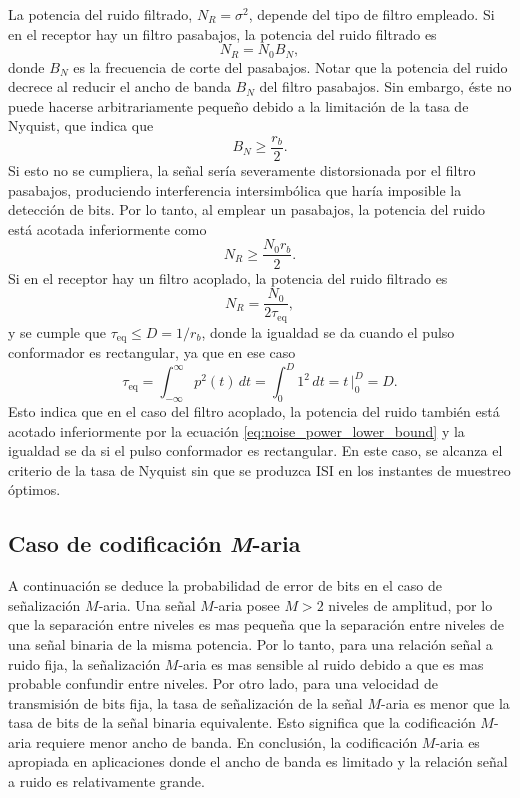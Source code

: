\documentclass[a4paper]{article}
\begin{document}
La potencia del ruido filtrado, \(N_R=\sigma^2\), depende del tipo de filtro empleado. Si en el receptor hay un filtro pasabajos, la potencia del ruido filtrado es
\[
 N_R=N_0B_N,
\]
donde \(B_N\) es la frecuencia de corte del pasabajos. Notar que la potencia del ruido decrece al reducir el ancho de banda \(B_N\) del filtro pasabajos. Sin embargo, éste no puede hacerse arbitrariamente pequeño debido a la limitación de la tasa de Nyquist, que indica que
\[
 B_N\geq\frac{r_b}{2}.
\]
Si esto no se cumpliera, la señal sería severamente distorsionada por el filtro pasabajos, produciendo interferencia intersimbólica que haría imposible la detección de bits. Por lo tanto, al emplear un pasabajos, la potencia del ruido está acotada inferiormente como
\begin{equation}\label{eq:noise_power_lower_bound}
 N_R\geq\frac{N_0r_b}{2}.
\end{equation}
Si en el receptor hay un filtro acoplado, la potencia del ruido filtrado es
\[
 N_R=\frac{N_0}{2\tau_\textrm{eq}},
\]
y se cumple que \(\tau_\textrm{eq}\leq D=1/r_b\), donde la igualdad se da cuando el pulso conformador es rectangular, ya que en ese caso
\[
 \tau_\textrm{eq}=\int_{-\infty}^{\infty}p^2(t)\,dt=\int_{0}^{D}1^2\,dt=t\,\bigg|_{0}^D=D.
\]
Esto indica que en el caso del filtro acoplado, la potencia del ruido también está acotado inferiormente por la ecuación \ref{eq:noise_power_lower_bound} y la igualdad se da si el pulso conformador es rectangular. En este caso, se alcanza el criterio de la tasa de Nyquist sin que se produzca ISI en los instantes de muestreo óptimos.

\subsection{Caso de codificación \emph{M}-aria}

A continuación se deduce la probabilidad de error de bits en el caso de señalización \(M\)-aria. Una señal \(M\)-aria posee \(M>2\) niveles de amplitud, por lo que la separación entre niveles es mas pequeña que la separación entre niveles de una señal binaria de la misma potencia. Por lo tanto, para una relación señal a ruido fija, la señalización \(M\)-aria es mas sensible al ruido debido a que es mas probable confundir entre niveles. Por otro lado, para una velocidad de transmisión de bits fija, la tasa de señalización de la señal \(M\)-aria es menor que la tasa de bits de la señal binaria equivalente. Esto significa que la codificación \(M\)-aria requiere menor ancho de banda. En conclusión, la codificación \(M\)-aria es apropiada en aplicaciones donde el ancho de banda es limitado y la relación señal a ruido es relativamente grande.
\end{document}
